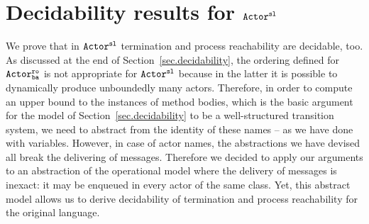\documentclass{LMCS}
\theoremstyle{plain}\newtheorem{proposition}[thm]{Proposition}
\theoremstyle{plain}\newtheorem{lemma}[thm]{Lemma}
\theoremstyle{plain}\newtheorem{theorem}[thm]{Theorem}
\theoremstyle{plain}\newtheorem{corollary}[thm]{Corollary}
\newcommand{\lleadsto}[1]{\stackrel{#1}{\leadsto}}
\newcommand{\actroba}{${\tt Actor^{\tt ro}_{\tt ba}}$}
\newcommand{\actsl}{${\tt Actor^{\tt sl}}$}
\begin{document}
\section{Decidability results for {\actsl}}
\label{sec.stateless}

\newcommand{\name}[1]{{\it name}(#1)}
\newcommand{\abseval}[1]{\lleadsto{#1}_\alpha}
\newcommand{\absred}[1]{\stackrel{#1}{\longrightarrow_{\mathsf a}}}
\newcommand{\abst}[1]{\Omega(#1)}
\newcommand{\rearrange}{\bowtie}
\newcommand{\shuffle}[2]{\it shuffle(#1,#2)}
\newcommand{\shuffleq}[2]{\it [\!\![ #1 ]\!\!]_{#2}}
\newcommand{\mulset}{\mathcal M}
\newcommand{\trans}[2]{\ensuremath{\xrightarrow{#1}}}
\newcommand{\abtrans}[2]{\ensuremath{\xrightarrow{#1}}_{\mathsf a}}
\newcommand{\code}[1]{\ensuremath{\mathcal{Q}(#1)}}







We prove that in {\actsl}
termination and process reachability are decidable, too.
As discussed at the end of Section~\ref{sec.decidability},
the ordering defined for {\actroba} is not appropriate for {\actsl}
because in the latter it is possible to dynamically produce unboundedly many actors.
Therefore, in order to compute an upper bound to
the instances of method bodies, which is the basic argument for the model of
Section~\ref{sec.decidability} to be a well-structured transition system, 
we need to abstract
from the identity of these names -- as we have done with variables.
However, in case of actor names, the abstractions we have devised all break the
delivering of messages. 
Therefore we decided to apply our arguments to an abstraction of the operational model where the delivery of messages is inexact: it may be enqueued in every actor of the same class. 
Yet, this abstract model allows us
to derive decidability of termination and process reachability for the original language. 
\end{document}
